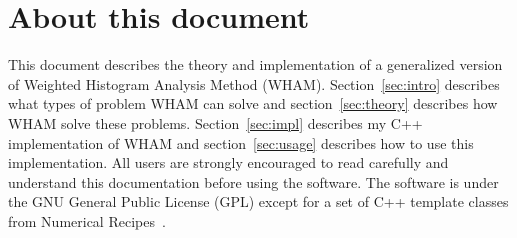 \section{About this document}
This document describes the theory and implementation of a generalized version
of Weighted Histogram Analysis Method (WHAM).  Section~\ref{sec:intro}
describes what types of problem WHAM can solve and section~\ref{sec:theory}
describes how WHAM solve these problems.  Section~\ref{sec:impl} describes my
C++ implementation of WHAM and section~\ref{sec:usage} describes how to use
this implementation.  All users are strongly encouraged to read carefully and
understand this documentation before using the software. The software is under
the GNU General Public License (GPL) except for a set of C++ template classes
from Numerical Recipes~\cite{NumRec2007}.
